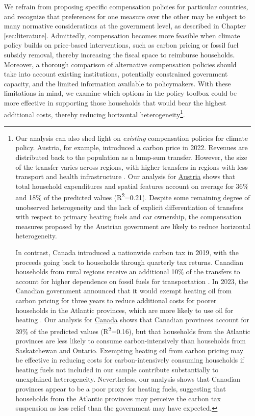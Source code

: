 \documentclass[12pt, a4paper]{article}
\begin{document}
We refrain from proposing specific compensation policies for particular countries, and recognize that preferences for one measure over the other may be subject to many normative considerations at the government level, as described in Chapter \ref{sec:literature}. Admittedly, compensation becomes more feasible when climate policy builds on price-based interventions, such as carbon pricing or fossil fuel subsidy removal, thereby increasing the fiscal space to reimburse households. Moreover, a thorough comparison of alternative compensation policies should take into account existing institutions, potentially constrained government capacity, and the limited information available to policymakers. With these limitations in mind, we examine which options in the policy toolbox could be more effective in supporting those households that would bear the highest additional costs, thereby reducing horizontal heterogeneity\footnote{Our analysis can also shed light on \textit{existing} compensation policies for climate policy. Austria, for example, introduced a carbon price in 2022. Revenues are distributed back to the population as a lump-sum transfer. However, the size of the transfer varies across regions, with higher transfers in regions with less transport and health infrastructure \autocite{BMK.2023}. Our analysis for \hyperref[fig:5b_AUT]{Austria} shows that total household expenditures and spatial features account on average for 36\% and 18\% of the predicted values (R\textsuperscript{2}=0.21). Despite some remaining degree of unobserved heterogeneity and the lack of explicit differentiation of transfers with respect to primary heating fuels and car ownership, the compensation measures proposed by the Austrian government are likely to reduce horizontal heterogeneity.

In contrast, Canada introduced a nationwide carbon tax in 2019, with the proceeds going back to households through quarterly tax returns. Canadian households from rural regions receive an additional 10\% of the transfers to account for higher dependence on fossil fuels for transportation \autocite{GovernmentofCanada.2023}. In 2023, the Canadian government announced that it would exempt heating oil from carbon pricing for three years to reduce additional costs for poorer households in the Atlantic provinces, which are more likely to use oil for heating \autocite{Reuters.2023}. Our analysis for \hyperref[fig:5b_CAN]{Canada} shows that Canadian provinces account for 39\% of the predicted values (R\textsuperscript{2}=0.16), but that households from the Atlantic provinces are less likely to consume carbon-intensively than households from Saskatchewan and Ontario. Exempting heating oil from carbon pricing may be effective in reducing costs for carbon-intensively consuming households if heating fuels not included in our sample contribute substantially to unexplained heterogeneity. Nevertheless, our analysis shows that Canadian provinces appear to be a poor proxy for heating fuels, suggesting that households from the Atlantic provinces may perceive the carbon tax suspension as less relief than the government may have expected.}.
\end{document}
